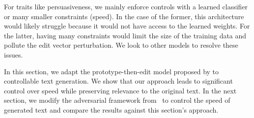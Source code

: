For traits like persuasiveness, we mainly enforce controls with a learned classifier or many smaller constraints (\eg speed). In the case of the former, this architecture would likely struggle because it would not have access to the learned weights. For the latter, having many constraints would limit the size of the training data and pollute the edit vector perturbation. We look to other models to resolve these issues.

In this section, we adapt the prototype-then-edit model proposed by \citet{guu2018generating} to controllable text generation. We show that our approach leads to significant control over speed while preserving relevance to the original text. In the next section, we modify the adversarial framework from~ to control the speed of generated text and compare the results against this section's approach.



